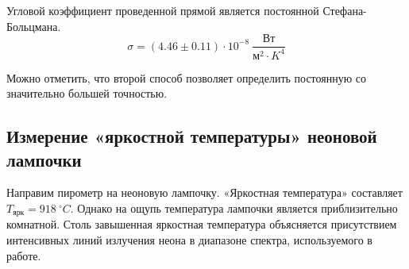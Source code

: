 \documentclass[14pt, a4paper]{report}
\begin{document}
Угловой коэффициент проведенной прямой является постоянной Стефана-Больцмана.
\[\sigma=(4.46\pm0.11)\cdot10^{-8}\ \frac{Вт}{м^2\cdot K^4}\]

Можно отметить, что второй способ позволяет определить постоянную со значительно большей точностью.

\subsection{Измерение «яркостной температуры» неоновой лампочки}

Направим пирометр на неоновую лампочку. «Яркостная температура» составляет $T_{ярк}=918\ ^\circ C$. Однако на ощупь температура лампочки является приблизительно комнатной. Столь завышенная яркостная температура объясняется присутствием интенсивных линий излучения неона в диапазоне спектра, используемого в работе.
\end{document}
